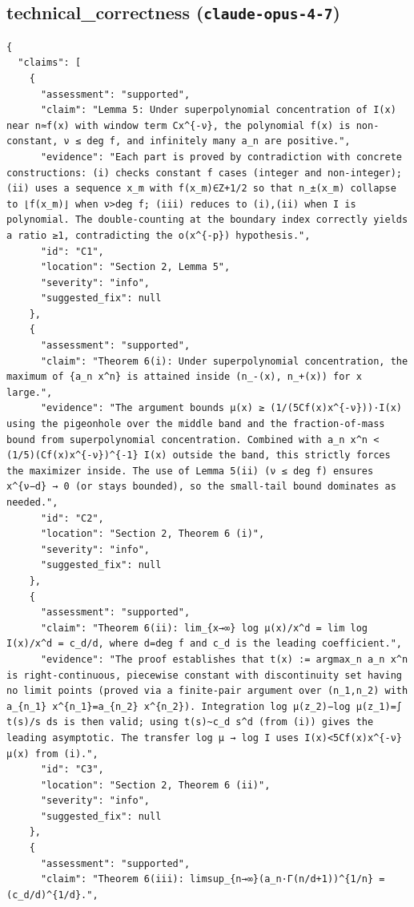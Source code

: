 \documentclass[11pt]{article}
\begin{document}
\subsection*{technical_correctness (\texttt{claude-opus-4-7})}
\begin{verbatim}
{
  "claims": [
    {
      "assessment": "supported",
      "claim": "Lemma 5: Under superpolynomial concentration of I(x) near n≈f(x) with window term Cx^{-ν}, the polynomial f(x) is non-constant, ν ≤ deg f, and infinitely many a_n are positive.",
      "evidence": "Each part is proved by contradiction with concrete constructions: (i) checks constant f cases (integer and non-integer); (ii) uses a sequence x_m with f(x_m)∈Z+1/2 so that n_±(x_m) collapse to ⌊f(x_m)⌋ when ν>deg f; (iii) reduces to (i),(ii) when I is polynomial. The double-counting at the boundary index correctly yields a ratio ≥1, contradicting the o(x^{-p}) hypothesis.",
      "id": "C1",
      "location": "Section 2, Lemma 5",
      "severity": "info",
      "suggested_fix": null
    },
    {
      "assessment": "supported",
      "claim": "Theorem 6(i): Under superpolynomial concentration, the maximum of {a_n x^n} is attained inside (n_-(x), n_+(x)) for x large.",
      "evidence": "The argument bounds μ(x) ≥ (1/(5Cf(x)x^{-ν}))·I(x) using the pigeonhole over the middle band and the fraction-of-mass bound from superpolynomial concentration. Combined with a_n x^n < (1/5)(Cf(x)x^{-ν})^{-1} I(x) outside the band, this strictly forces the maximizer inside. The use of Lemma 5(ii) (ν ≤ deg f) ensures x^{ν−d} → 0 (or stays bounded), so the small-tail bound dominates as needed.",
      "id": "C2",
      "location": "Section 2, Theorem 6 (i)",
      "severity": "info",
      "suggested_fix": null
    },
    {
      "assessment": "supported",
      "claim": "Theorem 6(ii): lim_{x→∞} log μ(x)/x^d = lim log I(x)/x^d = c_d/d, where d=deg f and c_d is the leading coefficient.",
      "evidence": "The proof establishes that t(x) := argmax_n a_n x^n is right-continuous, piecewise constant with discontinuity set having no limit points (proved via a finite-pair argument over (n_1,n_2) with a_{n_1} x^{n_1}=a_{n_2} x^{n_2}). Integration log μ(z_2)−log μ(z_1)=∫ t(s)/s ds is then valid; using t(s)~c_d s^d (from (i)) gives the leading asymptotic. The transfer log μ → log I uses I(x)<5Cf(x)x^{-ν} μ(x) from (i).",
      "id": "C3",
      "location": "Section 2, Theorem 6 (ii)",
      "severity": "info",
      "suggested_fix": null
    },
    {
      "assessment": "supported",
      "claim": "Theorem 6(iii): limsup_{n→∞}(a_n·Γ(n/d+1))^{1/n} = (c_d/d)^{1/d}.",

\end{verbatim}
\end{document}
